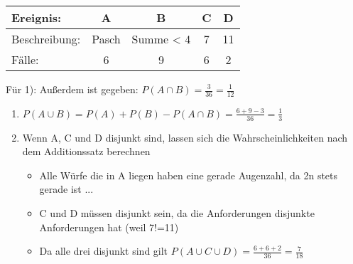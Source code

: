 \begin{tabular}{|l|c|c|c|c|}
	\hline
	Ereignis: & A & B & C & D \\
	\hline
	Beschreibung: & Pasch & Summe < 4 & 7 & 11 \\
	\hline
	Fälle: & 6 & 9 & 6 & 2 \\
	\hline
\end{tabular} 

Für 1): Außerdem ist gegeben: $ P(A \cap B ) = \frac{3}{36} = \frac{1}{12} $

\begin{enumerate}
	\item $P(A \cup B) = P(A) + P(B) - P(A \cap B) = \frac{6+9-3}{36}=\frac{1}{3}$
	\item Wenn A, C und D disjunkt sind, lassen sich die Wahrscheinlichkeiten nach dem Additionssatz berechnen
	\begin{itemize}
		\item Alle Würfe die in A liegen haben eine gerade Augenzahl, da 2n stets gerade ist ...
		\item C und D müssen disjunkt sein, da die Anforderungen disjunkte Anforderungen hat (weil 7!=11)
		\item Da alle drei disjunkt sind gilt $P(A \cup C \cup D) = \frac{6+6+2}{36} = \frac{7}{18}$
	\end{itemize}
\end{enumerate}
